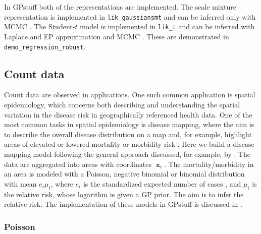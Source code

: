 \documentclass[twoside,11pt]{article}
\DeclareMathOperator{\x}{\mathbf{x}}
\newcommand{\pkg}[1]{{\fontseries{b}\selectfont #1}}
\newcommand{\code}[1]{{\normalfont\texttt{#1}}}
\begin{document}
In \pkg{GPstuff} both of the representations are implemented. The
scale mixture representation is implemented in
\code{lik\_gaussiansmt} and can be inferred only with MCMC \citep[as
described by][]{Neal:1998}. The Student-$t$ model is
implemented in \code{lik\_t} and can be inferred with Laplace and EP
approximation and MCMC \citep[as described
by][]{Vanhatalo+Jylanki+Vehtari:2009,Jylanki+Vanhatalo+Vehtari:2011}.
These are demonstrated in \code{demo\_regression\_robust}.


\subsection{Count data}\label{sec_spatial_demo1}

Count data are observed in applications. One such common application
is spatial epidemiology, which concerns both describing and
understanding the spatial variation in the disease risk in
geographically referenced health data. One of the most common tasks in
spatial epidemiology is disease mapping, where the aim is to describe
the overall disease distribution on a map and, for example, highlight
areas of elevated or lowered mortality or morbidity risk
\citep[e.g.][]{Lawson:2001,Richardson:2003,Elliot+Wakefield+Best+Briggs:2001}.
Here we build a disease mapping model following the general approach
discussed, for example, by \citet{Best+Richardson+Thomson:2005}. The
data are aggregated into areas with coordinates $\x_i$. The
mortality/morbidity in an area is modeled with a Poisson, negative
binomial or binomial distribution with mean $e_i\mu_i$, where $e_i$ is
the standardized expected number of cases
\citep[e.g.][]{Ahmad+all:2000}, and $\mu_i$ is the relative risk,
whose logarithm is given a GP prior. The aim is to infer the relative
risk. The implementation of these models in \pkg{GPstuff} is discussed
in \citep{Vanhatalo+Vehtari:2007,Vanhatalo+Pietilainen+Vehtari:2010}.

\subsubsection{Poisson}
\end{document}
